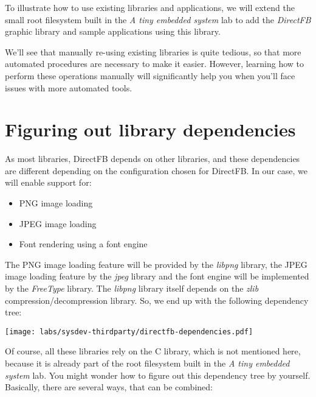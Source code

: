 
To illustrate how to use existing libraries and applications, we will
extend the small root filesystem built in the {\em A tiny embedded
  system} lab to add the {\em DirectFB} graphic library and sample
applications using this library.

We'll see that manually re-using existing libraries is quite tedious,
so that more automated procedures are necessary to make it
easier. However, learning how to perform these operations manually
will significantly help you when you'll face issues with more
automated tools.

\section{Figuring out library dependencies}

As most libraries, DirectFB depends on other libraries, and these
dependencies are different depending on the configuration chosen for
DirectFB. In our case, we will enable support for:

\begin{itemize}
\item PNG image loading
\item JPEG image loading
\item Font rendering using a font engine
\end{itemize}

The PNG image loading feature will be provided by the {\em libpng}
library, the JPEG image loading feature by the {\em jpeg} library and
the font engine will be implemented by the {\em FreeType} library. The
{\em libpng} library itself depends on the {\em zlib}
compression/decompression library. So, we end up with the following
dependency tree:

\begin{center}
\texttt{[image: labs/sysdev-thirdparty/directfb-dependencies.pdf]}
\end{center}

Of course, all these libraries rely on the C library, which is not
mentioned here, because it is already part of the root filesystem
built in the {\em A tiny embedded system} 
lab. You might wonder how to
figure out this dependency tree by yourself. Basically, there are
several ways, that can be combined:

